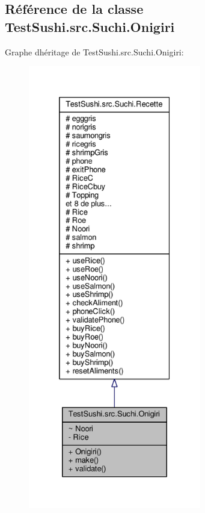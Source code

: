 \hypertarget{classTestSushi_1_1src_1_1Suchi_1_1Onigiri}{}\subsection{Référence de la classe Test\+Sushi.\+src.\+Suchi.\+Onigiri}
\label{classTestSushi_1_1src_1_1Suchi_1_1Onigiri}


Graphe d\textquotesingle{}héritage de Test\+Sushi.\+src.\+Suchi.\+Onigiri\+:\nopagebreak
\begin{figure}[H]
\begin{center}
\leavevmode
\includegraphics[height=550pt]{classTestSushi_1_1src_1_1Suchi_1_1Onigiri__inherit__graph}
\end{center}
\end{figure}


